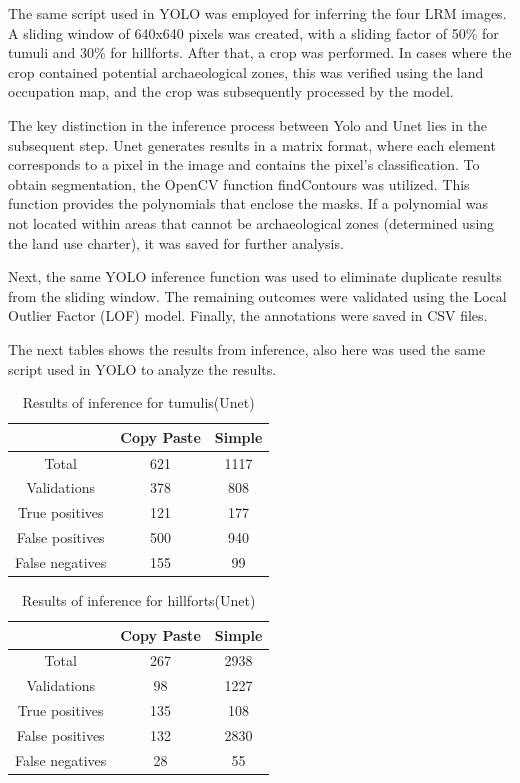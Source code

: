 The same script used in YOLO was employed for inferring the four LRM images. A sliding window of 640x640 pixels was created, with a sliding factor of 50\% for tumuli and 30\% for hillforts. After that, a crop was performed. In cases where the crop contained potential archaeological zones, this was verified using the land occupation map, and the crop was subsequently processed by the model.

The key distinction in the inference process between Yolo and Unet lies in the subsequent step. Unet generates results in a matrix format, where each element corresponds to a pixel in the image and contains the pixel's classification. To obtain segmentation, the OpenCV function findContours was utilized. This function provides the polynomials that enclose the masks. If a polynomial was not located within areas that cannot be archaeological zones (determined using the land use charter), it was saved for further analysis.

Next, the same YOLO inference function was used to eliminate duplicate results from the sliding window. The remaining outcomes were validated using the Local Outlier Factor (LOF) model. Finally, the annotations were saved in CSV files.

The next tables shows the results from inference, also here was used the same script used in YOLO to analyze the results.

\begin{table}[H]
\centering
\begin{tabular}{|c c c|} 
 \hline
  &  Copy Paste & Simple \\ [0.5ex] 
 \hline\hline
 Total & 621 & 1117 \\ 
 Validations & 378 & 808 \\
 True positives & 121 & 177 \\
 False positives & 500 & 940 \\
 False negatives & 155 & 99\\ [1ex] 
 \hline
\end{tabular}
\caption{Results of inference for tumulis(Unet)}
\end{table}

\begin{table}[H]
\centering
\begin{tabular}{|c c c|} 
 \hline
  & Copy Paste & Simple \\ [0.5ex] 
 \hline\hline
 Total & 267 & 2938 \\ 
 Validations & 98 & 1227\\
 True positives & 135 & 108 \\
 False positives & 132 & 2830 \\
 False negatives & 28 & 55\\ [1ex] 
 \hline
\end{tabular}
\caption{Results of inference for hillforts(Unet)}
\end{table}


